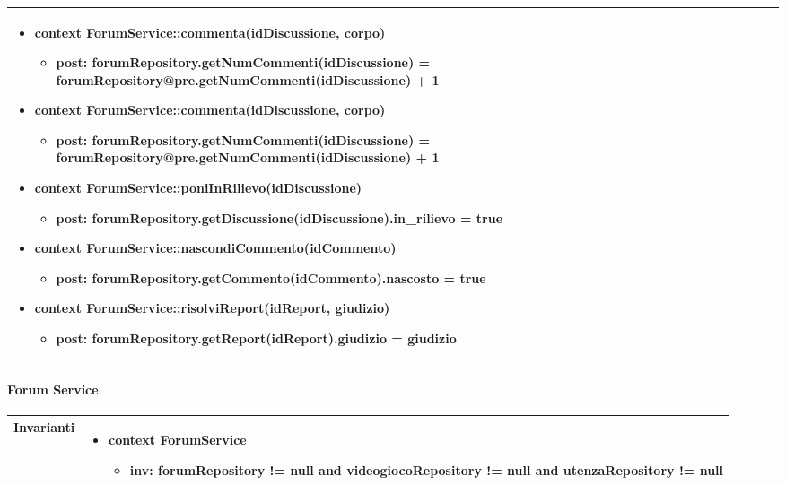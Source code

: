 \begin{tabular}{|| l | p{28em} ||}
\begin{itemize}[leftmargin=*]
		\item \textbf{context} ForumService::commenta(idDiscussione, corpo)
		\begin{itemize}
			\item[ ] \textbf{post:} forumRepository.getNumCommenti(idDiscussione) = forumRepository@pre.getNumCommenti(idDiscussione) + 1
		\end{itemize}

		\item \textbf{context} ForumService::commenta(idDiscussione, corpo)
		\begin{itemize}
			\item[ ] \textbf{post:} forumRepository.getNumCommenti(idDiscussione) = forumRepository@pre.getNumCommenti(idDiscussione) + 1
		\end{itemize}

		\item \textbf{context} ForumService::poniInRilievo(idDiscussione)
		\begin{itemize}
			\item[ ] \textbf{post:} forumRepository.getDiscussione(idDiscussione).in\_rilievo = true
		\end{itemize}

		\item \textbf{context} ForumService::nascondiCommento(idCommento)
		\begin{itemize}
			\item[ ] \textbf{post:} forumRepository.getCommento(idCommento).nascosto = true
		\end{itemize}

		\item \textbf{context} ForumService::risolviReport(idReport, giudizio)
		\begin{itemize}
			\item[ ] \textbf{post:} forumRepository.getReport(idReport).giudizio = giudizio
		\end{itemize}
	\end{itemize}\\
	\hline
\end{tabular}

\newpage
\paragraph{Forum Service}
\small\begin{tabular}{|| l | p{28em} ||} 
	\hline
	Invarianti & \begin{itemize}
		\item \textbf{context} ForumService
		\begin{itemize}
			\item[ ] \textbf{inv:} forumRepository != null and  videogiocoRepository != null and utenzaRepository != null
		\end{itemize}
	\end{itemize}\\
	\hline
\end{tabular}

